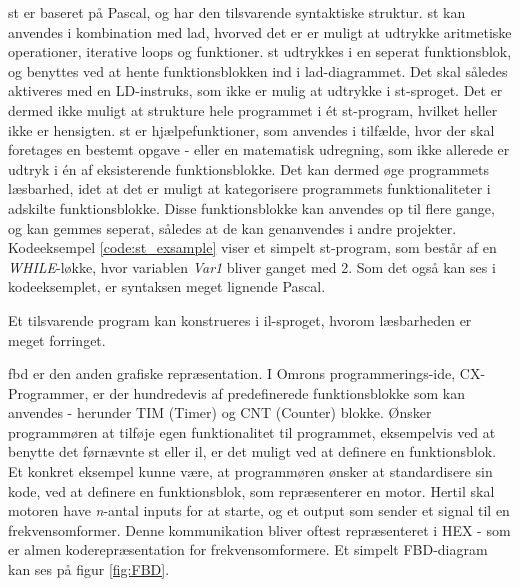 \gls{st} er baseret på Pascal, og har den tilsvarende syntaktiske struktur. \gls{st} kan anvendes i kombination med \gls{lad}, hvorved det er er muligt at udtrykke aritmetiske operationer, iterative loops og funktioner. \gls{st} udtrykkes i en seperat funktionsblok, og benyttes ved at hente funktionsblokken ind i \gls{lad}-diagrammet. Det skal således aktiveres med en LD-instruks, som ikke er mulig at udtrykke i \gls{st}-sproget. Det er dermed ikke muligt at strukture hele programmet i ét \gls{st}-program, hvilket heller ikke er hensigten. \gls{st} er hjælpefunktioner, som anvendes i tilfælde, hvor der skal foretages en bestemt opgave - eller en matematisk udregning, som ikke allerede er udtryk i én af eksisterende funktionsblokke. Det kan dermed øge programmets læsbarhed, idet at det er muligt at kategorisere programmets funktionaliteter i adskilte funktionsblokke. Disse funktionsblokke kan anvendes op til flere gange, og kan gemmes seperat, således at de kan genanvendes i andre projekter.\\

\noindent Kodeeksempel \ref{code:st_exsample} viser et simpelt \gls{st}-program, som består af en \textit{WHILE}-løkke, hvor variablen \textit{Var1} bliver ganget med 2. Som det også kan ses i kodeeksemplet, er syntaksen meget lignende Pascal.


\noindent Et tilsvarende program kan konstrueres i \gls{il}-sproget, hvorom læsbarheden er meget forringet.  

\gls{fbd} er den anden grafiske repræsentation. I Omrons programmerings-\gls{ide}, CX-Programmer, er der hundredevis af predefinerede funktionsblokke som kan anvendes - herunder TIM (Timer) og CNT (Counter) blokke. Ønsker programmøren at tilføje egen funktionalitet til programmet, eksempelvis ved at benytte det førnævnte \gls{st} eller \gls{il}, er det muligt ved at definere en funktionsblok. Et konkret eksempel kunne være, at programmøren ønsker at standardisere sin kode, ved at definere en funktionsblok, som repræsenterer en motor. Hertil skal motoren have \textit{n}-antal inputs for at starte, og et output som sender et signal til en frekvensomformer. Denne kommunikation bliver oftest repræsenteret i HEX - som er almen koderepræsentation for frekvensomformere. Et simpelt FBD-diagram kan ses på figur \ref{fig:FBD}.

